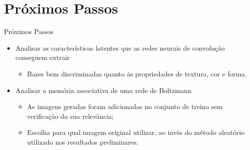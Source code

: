\documentclass{beamer}
\begin{document}
\section{Próximos Passos}
\setlength\leftmargini{0em}
\justifying
\begin{frame}{Próximos Passos}
  \begin{itemize}
  \item Analisar as características latentes que as redes neurais de convolução conseguem extrair
    \begin{itemize}
      \item Bases bem discriminadas quanto às propriedades de textura, cor e forma.
    \end{itemize}
  \item Analisar a memória associativa de uma rede de Boltzmann 
  \begin{itemize}
    \item As imagens geradas foram adicionadas no conjunto de treino sem verificação da sua relevância;
    \item Escolha para qual imagem original utilizar, ao invés do método aleatório utilizado nos resultados preliminares.
  \end{itemize}
  \end{itemize}



\end{frame}
\end{document}
